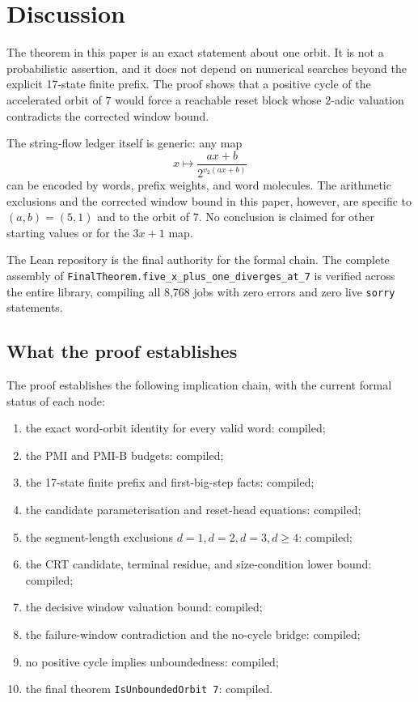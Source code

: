 \section{Discussion}\label{sec:discussion}

The theorem in this paper is an exact statement about one orbit.  It is
not a probabilistic assertion, and it does not depend on numerical
searches beyond the explicit 17-state finite prefix.  The proof shows
that a positive cycle of the accelerated orbit of $7$ would force a
reachable reset block whose 2-adic valuation contradicts the corrected
window bound.

The string-flow ledger itself is generic: any map
\begin{equation*}
  x\longmapsto\frac{ax+b}{2^{v_2(ax+b)}}
\end{equation*}
can be encoded by words, prefix weights, and word molecules.  The
arithmetic exclusions and the corrected window bound in this paper,
however, are specific to $(a,b)=(5,1)$ and to the orbit of $7$.  No
conclusion is claimed for other starting values or for the $3x+1$ map.

The Lean repository is the final authority for the formal chain.
The complete assembly of
\texttt{FinalTheorem.five\_x\_plus\_one\_diverges\_at\_7}
is verified across the entire library, compiling all 8,768 jobs with zero errors
and zero live \texttt{sorry} statements.

\subsection{What the proof establishes}

The proof establishes the following implication chain, with the
current formal status of each node:
\begin{enumerate}[leftmargin=*]
\item the exact word-orbit identity for every valid word: compiled;
\item the PMI and PMI-B budgets: compiled;
\item the 17-state finite prefix and first-big-step facts: compiled;
\item the candidate parameterisation and reset-head equations:
  compiled;
\item the segment-length exclusions $d=1,d=2,d=3,d\ge4$: compiled;
\item the CRT candidate, terminal residue, and size-condition lower
  bound: compiled;
\item the decisive window valuation bound: compiled;
\item the failure-window contradiction and the no-cycle bridge: compiled;
\item no positive cycle implies unboundedness: compiled;
\item the final theorem \texttt{IsUnboundedOrbit 7}: compiled.
\end{enumerate}

